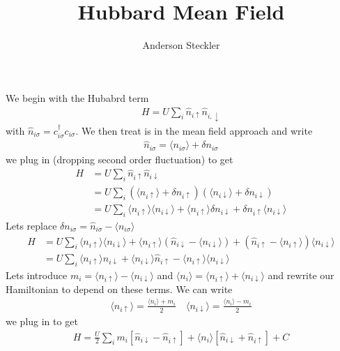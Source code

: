 \documentclass[11pt]{article}
\title{Hubbard Mean Field}
\author{Anderson Steckler}
\date{}
\begin{document}
\maketitle
\noindent
We begin with the Hubabrd term
\begin{gather}
    H = U\sum_i \hat n_{i\uparrow}\hat n_{i, \downarrow}
\end{gather}
with $\hat n_{i\sigma}=c_{i\sigma}^\dagger c_{i\sigma}$. We then treat is in the mean field approach and write
\begin{gather}
    \hat n_{i\sigma} = \langle n_{i\sigma}\rangle + \delta n_{i\sigma}
\end{gather}
we plug in (dropping second order fluctuation) to get
\begin{align}
    H &= U\sum_i\hat n_{i\uparrow}\hat n_{i \downarrow} \\\nonumber
    &= U\sum_i\left(\langle n_{i\uparrow} \rangle+\delta n_{i\uparrow}\right)\left(\langle n_{i\downarrow} \rangle+\delta n_{i\downarrow}\right) \\\nonumber
    &= U\sum_i \langle n_{i\uparrow}\rangle\langle n_{i\downarrow}\rangle + \langle n_{i\uparrow}\rangle\delta n_{i\downarrow} + \delta n_{i\uparrow}\langle n_{i\downarrow}\rangle
\end{align}
Lets replace $\delta n_{i\sigma}=\hat n_{i\sigma} - \langle n_{i\sigma}\rangle$
\begin{align}
    H&=U\sum_i \langle n_{i\uparrow}\rangle\langle n_{i\downarrow}\rangle + \langle n_{i\uparrow}\rangle(\hat n_{i\downarrow} - \langle n_{i\downarrow}\rangle) + (\hat n_{i\uparrow} - \langle n_{i\uparrow}\rangle)\langle n_{i\downarrow}\rangle \\\nonumber
    &= U \sum_i \langle n_{i\uparrow}\rangle \hat n_{i\downarrow} + \langle n_{i\downarrow}\rangle \hat n_{i\uparrow} - \langle n_{i\uparrow}\rangle \langle n_{i\downarrow}\rangle
\end{align}
Lets introduce $m_i = \langle n_{i\uparrow}\rangle - \langle n_{i\downarrow}\rangle$ and $\langle n_i\rangle = \langle n_{i\uparrow} \rangle + \langle n_{i\downarrow}\rangle$ and rewrite our Hamiltonian to depend on these terms. We can write
\begin{gather}
    \langle n_{i\uparrow}\rangle = \frac{\langle n_i \rangle + m_i}{2} \quad \langle n_{i\downarrow}\rangle = \frac{\langle n_i\rangle -m_i}{2}
\end{gather}
we plug in to get
\begin{align}
    H = \frac{U}{2}\sum_i m_i\left[\hat n_{i\downarrow} - \hat n_{i\uparrow}\right]  +\langle n_i\rangle \left[\hat n_{i\downarrow} + \hat n_{i\uparrow}\right] + C
\end{align}
\end{document}
